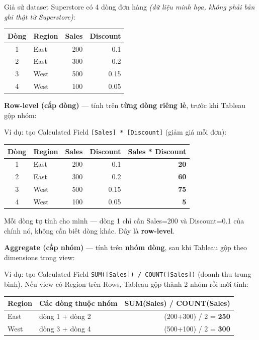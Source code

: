 \documentclass[12pt]{article}
\begin{document}
\noindent Giả sử dataset Superstore có 4 dòng đơn hàng \textit{(dữ liệu minh họa, không phải bản ghi thật từ Superstore)}:

\begin{center}
\renewcommand{\arraystretch}{1.4}
\begin{tabularx}{\linewidth}{c l r r}
\toprule
\textbf{Dòng} & \textbf{Region} & \textbf{Sales} & \textbf{Discount} \\
\midrule
1 & East & 200 & 0.1 \\
2 & East & 300 & 0.2 \\
3 & West & 500 & 0.15 \\
4 & West & 100 & 0.05 \\
\bottomrule
\end{tabularx}
\end{center}

\noindent \textbf{Row-level (cấp dòng)} --- tính trên \textbf{từng dòng riêng lẻ}, trước khi Tableau gộp nhóm:

\noindent Ví dụ: tạo Calculated Field \texttt{[Sales] * [Discount]} (giảm giá mỗi đơn):

\begin{center}
\renewcommand{\arraystretch}{1.4}
\begin{tabularx}{\linewidth}{c l r r r}
\toprule
\textbf{Dòng} & \textbf{Region} & \textbf{Sales} & \textbf{Discount} & \textbf{Sales * Discount} \\
\midrule
1 & East & 200 & 0.1 & \textbf{20} \\
2 & East & 300 & 0.2 & \textbf{60} \\
3 & West & 500 & 0.15 & \textbf{75} \\
4 & West & 100 & 0.05 & \textbf{5} \\
\bottomrule
\end{tabularx}
\end{center}

\noindent Mỗi dòng tự tính cho mình --- dòng 1 chỉ cần Sales=200 và Discount=0.1 của chính nó, không cần biết dòng khác. Đây là \textbf{row-level}.

\noindent \textbf{Aggregate (cấp nhóm)} --- tính trên \textbf{nhóm dòng}, sau khi Tableau gộp theo dimensions trong view:

\noindent Ví dụ: tạo Calculated Field \texttt{SUM([Sales]) / COUNT([Sales])} (doanh thu trung bình). Nếu view có Region trên Rows, Tableau gộp thành 2 nhóm rồi mới tính:

\begin{center}
\renewcommand{\arraystretch}{1.4}
\begin{tabularx}{\linewidth}{l X r}
\toprule
\textbf{Region} & \textbf{Các dòng thuộc nhóm} & \textbf{SUM(Sales) / COUNT(Sales)} \\
\midrule
East & dòng 1 + dòng 2 & (200+300) / 2 = \textbf{250} \\
West & dòng 3 + dòng 4 & (500+100) / 2 = \textbf{300} \\
\bottomrule
\end{tabularx}
\end{center}
\end{document}
